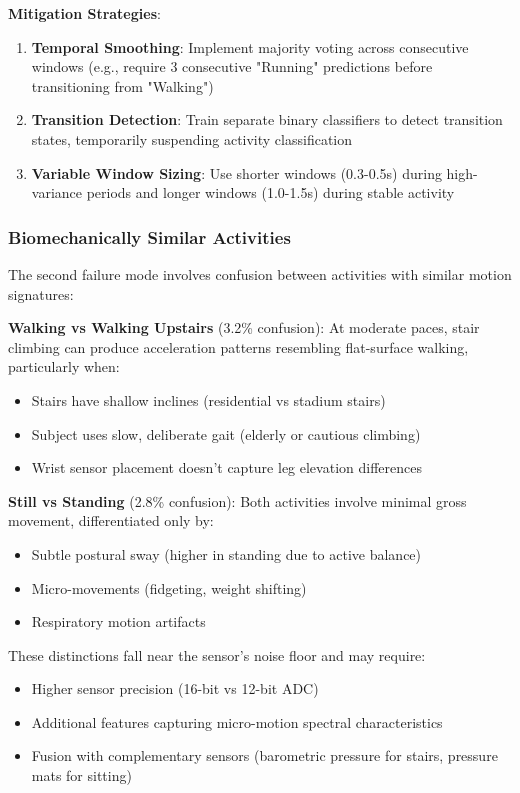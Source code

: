 \textbf{Mitigation Strategies}:
\begin{enumerate}
    \item \textbf{Temporal Smoothing}: Implement majority voting across consecutive windows (e.g., require 3 consecutive "Running" predictions before transitioning from "Walking")
    \item \textbf{Transition Detection}: Train separate binary classifiers to detect transition states, temporarily suspending activity classification
    \item \textbf{Variable Window Sizing}: Use shorter windows (0.3-0.5s) during high-variance periods and longer windows (1.0-1.5s) during stable activity
\end{enumerate}

\subsubsection{Biomechanically Similar Activities}
The second failure mode involves confusion between activities with similar motion signatures:

\textbf{Walking vs Walking Upstairs} (3.2\% confusion): At moderate paces, stair climbing can produce acceleration patterns resembling flat-surface walking, particularly when:
\begin{itemize}
    \item Stairs have shallow inclines (residential vs stadium stairs)
    \item Subject uses slow, deliberate gait (elderly or cautious climbing)
    \item Wrist sensor placement doesn't capture leg elevation differences
\end{itemize}

\textbf{Still vs Standing} (2.8\% confusion): Both activities involve minimal gross movement, differentiated only by:
\begin{itemize}
    \item Subtle postural sway (higher in standing due to active balance)
    \item Micro-movements (fidgeting, weight shifting)
    \item Respiratory motion artifacts
\end{itemize}

These distinctions fall near the sensor's noise floor and may require:
\begin{itemize}
    \item Higher sensor precision (16-bit vs 12-bit ADC)
    \item Additional features capturing micro-motion spectral characteristics
    \item Fusion with complementary sensors (barometric pressure for stairs, pressure mats for sitting)
\end{itemize}

